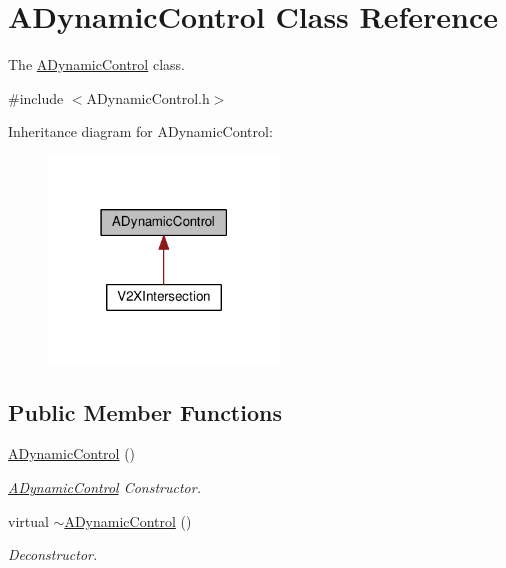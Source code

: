 \hypertarget{classADynamicControl}{}\section{A\+Dynamic\+Control Class Reference}
\label{classADynamicControl}


The \hyperlink{classADynamicControl}{A\+Dynamic\+Control} class.  




{\ttfamily \#include $<$A\+Dynamic\+Control.\+h$>$}



Inheritance diagram for A\+Dynamic\+Control\+:\nopagebreak
\begin{figure}[H]
\begin{center}
\leavevmode
\includegraphics[width=174pt]{classADynamicControl__inherit__graph}
\end{center}
\end{figure}
\subsection*{Public Member Functions}
\begin{DoxyCompactItemize}
\item 
\hyperlink{classADynamicControl_a71b2b173a5b7ed4eb77a5c60fb5f1774}{A\+Dynamic\+Control} ()\hypertarget{classADynamicControl_a71b2b173a5b7ed4eb77a5c60fb5f1774}{}\label{classADynamicControl_a71b2b173a5b7ed4eb77a5c60fb5f1774}

\begin{DoxyCompactList}\small\item\em \hyperlink{classADynamicControl}{A\+Dynamic\+Control} Constructor. \end{DoxyCompactList}\item 
virtual \hyperlink{classADynamicControl_ac52fec4aa95f1cd9ec4d3c65c45f5233}{$\sim$\+A\+Dynamic\+Control} ()\hypertarget{classADynamicControl_ac52fec4aa95f1cd9ec4d3c65c45f5233}{}\label{classADynamicControl_ac52fec4aa95f1cd9ec4d3c65c45f5233}

\begin{DoxyCompactList}\small\item\em Deconstructor. \end{DoxyCompactList}\end{DoxyCompactItemize}


